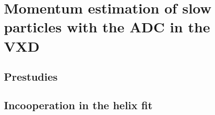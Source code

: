 \chapter{Momentum estimation of slow particles with the ADC in the VXD}
\section{Prestudies}
\section{Incooperation in the helix fit}
